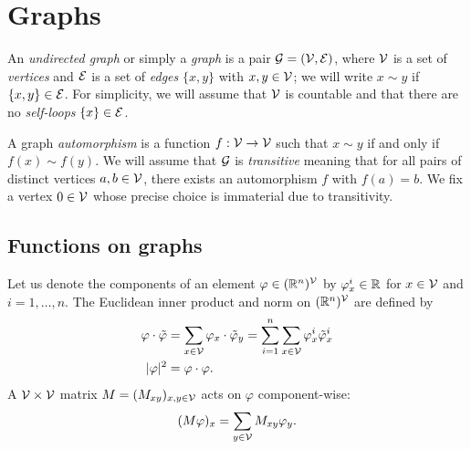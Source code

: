 
\section{Graphs}
\label{sec:graphs}


An \emph{undirected graph} or simply a \emph{graph} is a pair $\mathcal{G} = (\mathcal{V}, \mathcal{E})$,
where $\mathcal{V}$
is a set of \emph{vertices} and $\mathcal{E}$ is a set of
\emph{edges} $\{ x, y \}$ with $x, y \in \mathcal{V}$; we will write $x \sim y$ if
$\{ x, y \} \in \mathcal{E}$.
For simplicity, we will assume that $\mathcal{V}$ is countable and that there are no
\emph{self-loops} $\{ x \} \in \mathcal{E}$.

A graph \emph{automorphism} is a function $f : \mathcal{V}\rightarrow\mathcal{V}$ such that
$x \sim y$ if and only if $f(x) \sim f(y)$.
We will assume that $\mathcal{G}$ is \emph{transitive} meaning that for all pairs
of distinct
vertices $a, b \in \mathcal{V}$, there exists an automorphism $f$ with $f(a) = b$.
We fix a vertex $0\in\mathcal{V}$ whose precise choice is immaterial due to
transitivity.


\subsection{Functions on graphs}

Let us denote the components of an element $\varphi \in ({\mathbb R}^n)^{\mathcal{V}}$ by
$\varphi^i_x \in {\mathbb R}$ for $x \in \mathcal{V}$ and $i = 1, \ldots, n$.
The Euclidean inner product and norm on $({\mathbb R}^n)^{\mathcal{V}}$
are defined by
\begin{align}
\varphi\cdot\tilde\varphi
	&= \sum_{x\in\mathcal{V}} \varphi_x \cdot \tilde\varphi_y
  		= \sum_{i=1}^n \sum_{x\in\mathcal{V}} \varphi^i_x \tilde\varphi^i_x \\
|\varphi|^2
	&= \varphi \cdot \varphi.
\end{align}
A $\mathcal{V}\times\mathcal{V}$ matrix $M = (M_{xy})_{x,y\in\mathcal{V}}$ acts on $\varphi$
component-wise:
\begin{equation}
(M \varphi)_x = \sum_{y\in\mathcal{V}} M_{xy} \varphi_y.
\end{equation}

